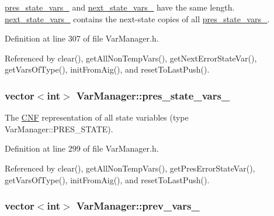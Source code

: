 \hyperlink{classVarManager_a25edf00cec0e31f140aabdf3a245a54c}{pres\-\_\-state\-\_\-vars\-\_\-} and \hyperlink{classVarManager_a2a697fcb384c73821d88104ac904f4e9}{next\-\_\-state\-\_\-vars\-\_\-} have the same length. \hyperlink{classVarManager_a2a697fcb384c73821d88104ac904f4e9}{next\-\_\-state\-\_\-vars\-\_\-} contains the next-\/state copies of all \hyperlink{classVarManager_a25edf00cec0e31f140aabdf3a245a54c}{pres\-\_\-state\-\_\-vars\-\_\-}. 

Definition at line 307 of file Var\-Manager.\-h.



Referenced by clear(), get\-All\-Non\-Temp\-Vars(), get\-Next\-Error\-State\-Var(), get\-Vars\-Of\-Type(), init\-From\-Aig(), and reset\-To\-Last\-Push().

\hypertarget{classVarManager_a25edf00cec0e31f140aabdf3a245a54c}{
\subsubsection[{pres\-\_\-state\-\_\-vars\-\_\-}]{\setlength{\rightskip}{0pt plus 5cm}vector$<$int$>$ Var\-Manager\-::pres\-\_\-state\-\_\-vars\-\_\-\hspace{0.3cm}{\ttfamily [protected]}}}\label{classVarManager_a25edf00cec0e31f140aabdf3a245a54c}


The \hyperlink{classCNF}{C\-N\-F} representation of all state variables (type Var\-Manager\-::\-P\-R\-E\-S\-\_\-\-S\-T\-A\-T\-E). 



Definition at line 299 of file Var\-Manager.\-h.



Referenced by clear(), get\-All\-Non\-Temp\-Vars(), get\-Pres\-Error\-State\-Var(), get\-Vars\-Of\-Type(), init\-From\-Aig(), and reset\-To\-Last\-Push().

\hypertarget{classVarManager_add744e4a073f7fd7bc595b053ac94774}{
\subsubsection[{prev\-\_\-vars\-\_\-}]{\setlength{\rightskip}{0pt plus 5cm}vector$<$int$>$ Var\-Manager\-::prev\-\_\-vars\-\_\-\hspace{0.3cm}{\ttfamily [protected]}}}\label{classVarManager_add744e4a073f7fd7bc595b053ac94774}


